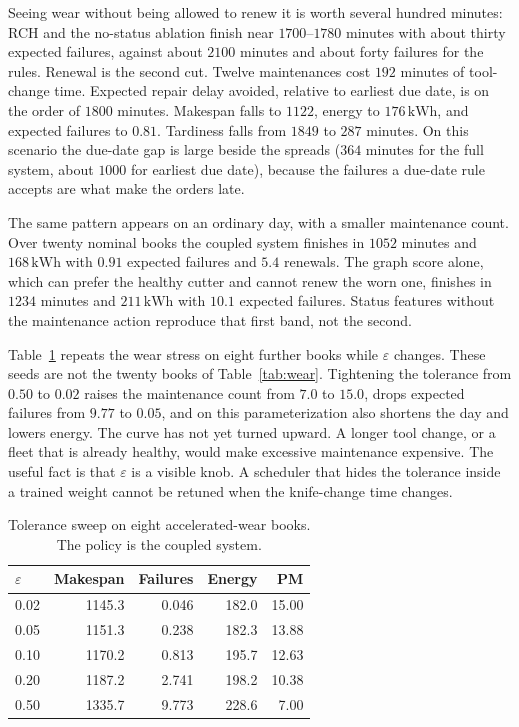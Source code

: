 \documentclass[10pt,a4paper]{article}
\begin{document}
Seeing wear without being allowed to renew it is worth several hundred minutes: RCH and the no-status ablation finish near \(1700\)--\(1780\) minutes with about thirty expected failures, against about \(2100\) minutes and about forty failures for the rules. Renewal is the second cut. Twelve maintenances cost \(192\) minutes of tool-change time. Expected repair delay avoided, relative to earliest due date, is on the order of \(1800\) minutes. Makespan falls to \(1122\), energy to \(176\,\mathrm{kWh}\), and expected failures to \(0.81\). Tardiness falls from \(1849\) to \(287\) minutes. On this scenario the due-date gap is large beside the spreads (\(364\) minutes for the full system, about \(1000\) for earliest due date), because the failures a due-date rule accepts are what make the orders late.

The same pattern appears on an ordinary day, with a smaller maintenance count. Over twenty nominal books the coupled system finishes in \(1052\) minutes and \(168\,\mathrm{kWh}\) with \(0.91\) expected failures and \(5.4\) renewals. The graph score alone, which can prefer the healthy cutter and cannot renew the worn one, finishes in \(1234\) minutes and \(211\,\mathrm{kWh}\) with \(10.1\) expected failures. Status features without the maintenance action reproduce that first band, not the second.

Table~\ref{tab:eps} repeats the wear stress on eight further books while \(\varepsilon\) changes. These seeds are not the twenty books of Table~\ref{tab:wear}. Tightening the tolerance from \(0.50\) to \(0.02\) raises the maintenance count from \(7.0\) to \(15.0\), drops expected failures from \(9.77\) to \(0.05\), and on this parameterization also shortens the day and lowers energy. The curve has not yet turned upward. A longer tool change, or a fleet that is already healthy, would make excessive maintenance expensive. The useful fact is that \(\varepsilon\) is a visible knob. A scheduler that hides the tolerance inside a trained weight cannot be retuned when the knife-change time changes.

\begin{table}[ht]
\centering
\caption{Tolerance sweep on eight accelerated-wear books. The policy is the coupled system.}
\label{tab:eps}
\small
\begin{tabular}{lrrrr}
\toprule
\(\varepsilon\) & Makespan & Failures & Energy & PM \\
\midrule
0.02 & 1145.3 & 0.046 & 182.0 & 15.00 \\
0.05 & 1151.3 & 0.238 & 182.3 & 13.88 \\
0.10 & 1170.2 & 0.813 & 195.7 & 12.63 \\
0.20 & 1187.2 & 2.741 & 198.2 & 10.38 \\
0.50 & 1335.7 & 9.773 & 228.6 & 7.00 \\
\bottomrule
\end{tabular}
\end{table}
\end{document}
